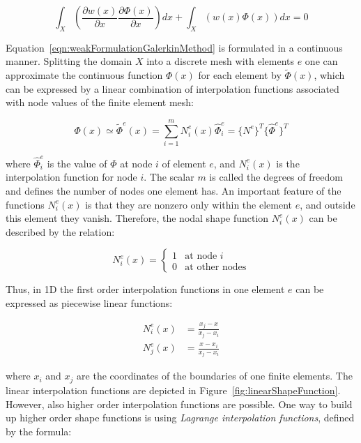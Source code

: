 \begin{equation}
	\int_{X} \left( \frac{\partial w(x)}{\partial x}\frac{\partial \Phi(x)}{\partial x} \right) dx + \int_{X} \left( w(x)\Phi(x) \right) dx = 0
	\label{eqn:weakFormulationGalerkinMethod}
\end{equation}

Equation~\ref{eqn:weakFormulationGalerkinMethod} is formulated in a continuous manner. Splitting the domain $X$ into a discrete mesh with elements $e$ one can approximate the continuous function $\Phi(x)$ for each element by $\tilde{\Phi}(x)$, which can be expressed by a linear combination of interpolation functions associated with node values of the finite element mesh:

\begin{equation}
	\Phi(x) \simeq \tilde{\Phi}^{e}(x) = \sum_{i=1}^{m} N_{i}^{e}(x)\hat{\Phi}_{i}^{e} = \{N^{e}\}^{T}\{\hat{\Phi}^{e}\}^{T}
	\label{eqn:functionApproximation}
\end{equation}

where $\hat{\Phi}_{i}^{e}$ is the value of $\Phi$ at node $i$ of element $e$, and $N_{i}^{e}(x)$ is the interpolation function for node $i$. The scalar $m$ is called the degrees of freedom and defines the number of nodes one element has. An important feature of the functions $N_{i}^{e}(x)$ is that they are nonzero only within the element $e$, and outside this element they vanish. Therefore, the nodal shape function $N_{i}^{e}(x)$ can be described by the relation:

\begin{equation*}
N_{i}^{e}(x) = \begin{cases}
1 &\text{at node $i$}\\
0 &\text{at other nodes}
\end{cases}
\end{equation*}

Thus, in 1D the first order interpolation functions in one element $e$ can be expressed as piecewise linear functions:

\begin{eqnarray}
	N_{i}^{e}(x) &= \frac{x_{j}-x}{x_{j}-x_{i}} \\
	N_{j}^{e}(x) &= \frac{x-x_{i}}{x_{j}-x_{i}}
\end{eqnarray}

where $x_{i}$ and $x_{j}$ are the coordinates of the boundaries of one finite elements. The linear interpolation functions are depicted in Figure~\ref{fig:linearShapeFunction}. However, also higher order interpolation functions are possible. One way to build up higher order shape functions is using \emph{Lagrange interpolation functions}, defined by the formula:


